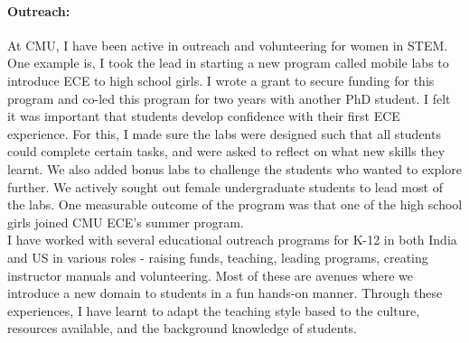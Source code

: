 \documentclass[10pt]{article}
\begin{document}
 

 \paragraph{Outreach: } 
 At CMU, I have been active in outreach and volunteering for women in STEM. %
One example is, I took the lead in starting a new program called mobile labs to introduce ECE to high school girls. I wrote a grant to secure funding for this program and co-led this program for two years with another PhD student. I felt it was important that students develop confidence with their first ECE experience. For this, I made sure the labs were designed such that all students could complete certain tasks, and were asked to reflect on what new skills they learnt. We also added bonus labs to challenge the students who wanted to explore further. We actively sought out female undergraduate students to lead most of the labs. One measurable outcome of the program was that one of the high school girls joined CMU ECE's summer program. \\

I have worked with several educational outreach programs for K-12 in both India and US in various roles - raising funds, teaching, leading programs, creating instructor manuals and volunteering. Most of these are avenues where we introduce a new domain to students in a fun hands-on manner. Through these experiences, I have learnt to adapt the teaching style based to the culture, resources available, and the background knowledge of students. \\
\end{document}
